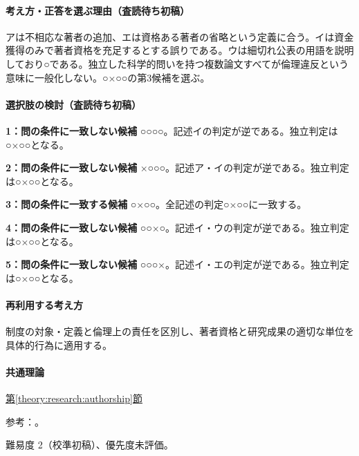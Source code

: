 \paragraph{考え方・正答を選ぶ理由（査読待ち初稿）} アは不相応な著者の追加、エは資格ある著者の省略という定義に合う。イは資金獲得のみで著者資格を充足するとする誤りである。ウは細切れ公表の用語を説明しており○である。独立した科学的問いを持つ複数論文すべてが倫理違反という意味に一般化しない。○×○○の第3候補を選ぶ。

\paragraph{選択肢の検討（査読待ち初稿）}\mbox{}\par

\noindent\textbf{1：問の条件に一致しない候補} ○○○○。記述イの判定が逆である。独立判定は○×○○となる。\par

\noindent\textbf{2：問の条件に一致しない候補} ×○○○。記述ア・イの判定が逆である。独立判定は○×○○となる。\par

\noindent\textbf{3：問の条件に一致する候補} ○×○○。全記述の判定○×○○に一致する。\par

\noindent\textbf{4：問の条件に一致しない候補} ○○×○。記述イ・ウの判定が逆である。独立判定は○×○○となる。\par

\noindent\textbf{5：問の条件に一致しない候補} ○○○×。記述イ・エの判定が逆である。独立判定は○×○○となる。\par

\paragraph{再利用する考え方} 制度の対象・定義と倫理上の責任を区別し、著者資格と研究成果の適切な単位を具体的行為に適用する。

\paragraph{共通理論} \hyperref[theory:research:authorship]{第\ref*{theory:research:authorship}節}

\par 参考：\cite{jsps_integrity2025}。

\par 難易度 2（校準初稿）、優先度未評価。

